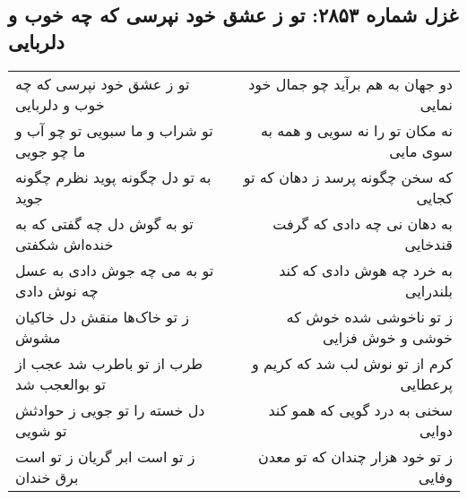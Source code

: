 \begin{center}
\section*{غزل شماره ۲۸۵۳: تو ز عشق خود نپرسی که چه خوب و دلربایی}
\label{sec:2853}
\begin{longtable}{l p{0.5cm} r}
تو ز عشق خود نپرسی که چه خوب و دلربایی
&&
دو جهان به هم برآید چو جمال خود نمایی
\\
تو شراب و ما سبویی تو چو آب و ما چو جویی
&&
نه مکان تو را نه سویی و همه به سوی مایی
\\
به تو دل چگونه پوید نظرم چگونه جوید
&&
که سخن چگونه پرسد ز دهان که تو کجایی
\\
تو به گوش دل چه گفتی که به خنده‌اش شکفتی
&&
به دهان نی چه دادی که گرفت قندخایی
\\
تو به می چه جوش دادی به عسل چه نوش دادی
&&
به خرد چه هوش دادی که کند بلندرایی
\\
ز تو خاک‌ها منقش دل خاکیان مشوش
&&
ز تو ناخوشی شده خوش که خوشی و خوش فزایی
\\
طرب از تو باطرب شد عجب از تو بوالعجب شد
&&
کرم از تو نوش لب شد که کریم و پرعطایی
\\
دل خسته را تو جویی ز حوادثش تو شویی
&&
سخنی به درد گویی که همو کند دوایی
\\
ز تو است ابر گریان ز تو است برق خندان
&&
ز تو خود هزار چندان که تو معدن وفایی
\\
\end{longtable}
\end{center}
